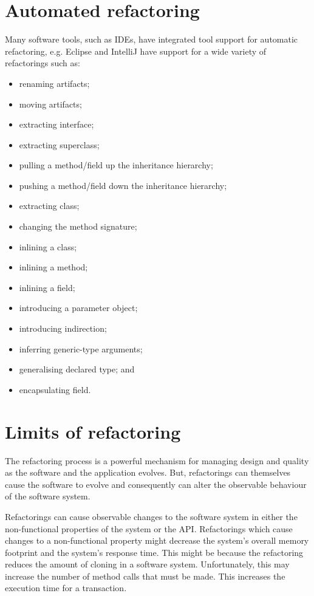 \documentclass[a4paper, openany]{memoir}
\begin{document}
\section{Automated refactoring}
Many software tools, such as IDEs, have integrated tool support for automatic refactoring, e.g. Eclipse and IntelliJ have support for a wide variety of refactorings such as:
\begin{itemize}
    \item renaming artifacts;
    \item moving artifacts;
    \item extracting interface;
    \item extracting superclass;
    \item pulling a method/field up the inheritance hierarchy;
    \item pushing a method/field down the inheritance hierarchy;
    \item extracting class;
    \item changing the method signature;
    \item inlining a class;
    \item inlining a method;
    \item inlining a field;
    \item introducing a parameter object;
    \item introducing indirection;
    \item inferring generic-type arguments;
    \item generalising declared type; and
    \item encapsulating field.
\end{itemize}

\section{Limits of refactoring}
The refactoring process is a powerful mechanism for managing design and quality as the software and the application evolves. But, refactorings can themselves cause the software to evolve and consequently can alter the observable behaviour of the software system. 

Refactorings can cause observable changes to the software system in either the non-functional properties of the system or the API. Refactorings which cause changes to a non-functional property might decrease the system's overall memory footprint and the system's response time. This might be because the refactoring reduces the amount of cloning in a software system. Unfortunately, this may increase the number of method calls that must be made. This increases the execution time for a transaction.
\end{document}
